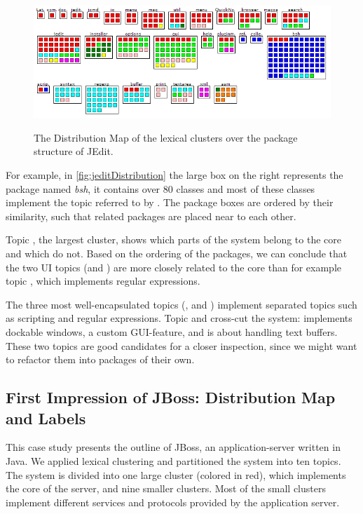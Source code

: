 \begin{figure}[h]
  \centering
  \includegraphics[width=\linewidth]{fig/hapax-jedit-distribution}\\
  \caption{The Distribution Map of the lexical clusters over the package structure of JEdit.}\label{fig:jeditDistribution}
\end{figure}


For example, in \autoref{fig:jeditDistribution} the large box on the right represents the package named \emph{bsh}, it contains over 80 classes and most of these classes implement the topic referred to by \blue. The package boxes are ordered by their similarity, such that related packages are placed near to each other.

Topic \red, the largest cluster, shows which parts of the system belong to the core and which do not. Based on the ordering of the packages, we can conclude that the two UI topics (\eg \green and \yellow) are more closely related to the core than for example topic \cyan, which implements regular expressions.

The three most well-encapsulated topics (\eg \orange, \blue and \cyan) implement separated topics such as scripting and regular expressions. Topic \yellow and \pink cross-cut the system: \yellow implements dockable windows, a custom GUI-feature, and \pink is about handling text buffers. These two topics are good candidates for a closer inspection, since we might want to refactor them into packages of their own.

\subsection{First Impression of JBoss: Distribution Map and Labels}\label{sec:azureus}

This case study presents the outline of JBoss, an application-server written in Java. We applied lexical clustering and partitioned the system into ten topics. The system is divided into one large cluster (colored in red), which implements the core of the server, and nine smaller clusters. Most of the small clusters implement different services and protocols provided by the application server.

